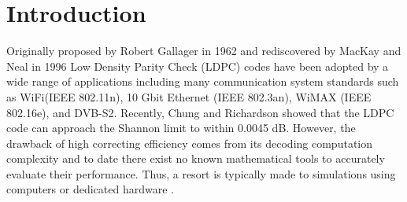 \documentclass[conference]{IEEEtran}
\begin{document}
\begin{abstract}




\end{abstract}


\IEEEpeerreviewmaketitle



\section{Introduction}
Originally proposed by Robert Gallager in 1962 \cite{art_gallager} and rediscovered by MacKay and Neal in 1996 \cite{art_macKay} Low Density Parity Check (LDPC) codes have been adopted by a wide range of applications including many communication system standards such as WiFi(IEEE 802.11n), 10 Gbit Ethernet (IEEE 802.3an), WiMAX (IEEE 802.16e), and DVB-S2. Recently, Chung and Richardson \cite{art_shannon} showed that the LDPC code can approach the Shannon limit to within 0.0045 dB. However, the drawback of high correcting efficiency comes from its decoding computation complexity \cite{art_ldpc_cpu1} and to date there exist no known mathematical tools to accurately evaluate their performance. Thus, a resort is typically made to simulations using computers or dedicated hardware \cite{art_memory_coalesced}.
\end{document}
